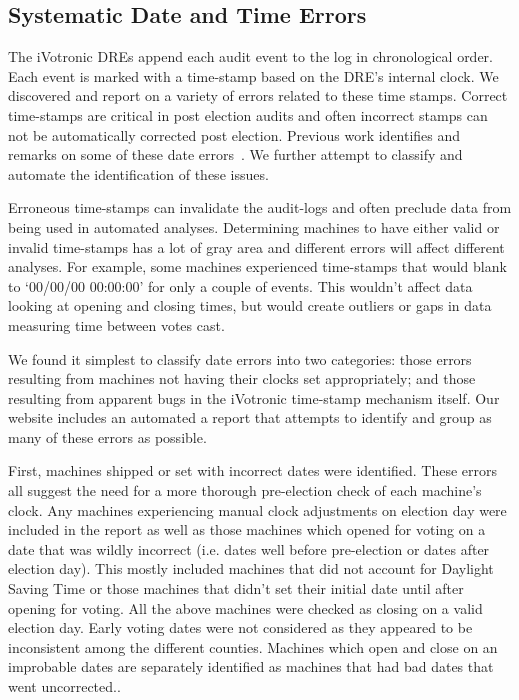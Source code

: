 \subsection{Systematic Date and Time Errors}\label{an:date}
The iVotronic DREs append each audit event to the log in chronological order.  Each event is marked with a time-stamp based on the DRE's internal clock.  We discovered and report on a variety of errors related to these time stamps. Correct time-stamps are critical in post election audits and often incorrect stamps can not be automatically corrected post election.  Previous work identifies and remarks on some of these date errors~\cite{Buell2011,Sandler2007}.  We further attempt to classify and automate the identification of these issues.

Erroneous time-stamps can invalidate the audit-logs and often preclude data from being used in automated analyses.  Determining machines to have either valid or invalid time-stamps has a lot of gray area and different errors will affect different analyses.  For example, some machines experienced time-stamps that would blank to \textquoteleft 00/00/00 00:00:00' for only a couple of events.  This wouldn't affect data looking at opening and closing times, but would create outliers or gaps in data measuring time between votes cast.  

We found it simplest to classify date errors into two categories: those errors resulting from machines not having their clocks set appropriately; and those resulting from apparent bugs in the iVotronic time-stamp mechanism itself.  Our website includes an automated a report that attempts to identify and group as many of these errors as possible.

First, machines shipped or set with incorrect dates were identified.  These errors all suggest the need for a more thorough pre-election check of each machine's clock.   Any machines experiencing manual clock adjustments on election day were included in the report as well as those machines which opened for voting on a date that was wildly incorrect (i.e. dates well before pre-election or dates after election day). This mostly included machines that did not account for Daylight Saving Time or  those machines that didn't set their initial date until after opening for voting.  All the above machines were checked as closing on a valid election day.  Early voting dates were not considered as they appeared to be inconsistent among the different counties. Machines which open and close on an improbable dates are separately identified as machines that had bad dates that went uncorrected..  


